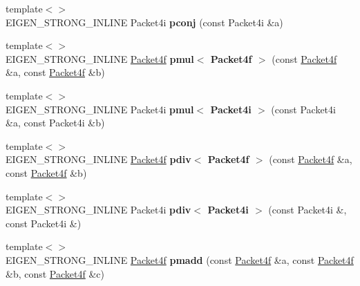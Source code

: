\begin{DoxyCompactItemize}
{\footnotesize template$<$$>$ }\\E\+I\+G\+E\+N\+\_\+\+S\+T\+R\+O\+N\+G\+\_\+\+I\+N\+L\+I\+NE Packet4i {\bfseries pconj} (const Packet4i \&a)
\item 
\mbox{\label{namespace_eigen_1_1internal_a5828d050de45a585645f9a959b52a10c}} 
{\footnotesize template$<$$>$ }\\E\+I\+G\+E\+N\+\_\+\+S\+T\+R\+O\+N\+G\+\_\+\+I\+N\+L\+I\+NE \hyperlink{struct_eigen_1_1internal_1_1_packet4f}{Packet4f} {\bfseries pmul$<$ Packet4f $>$} (const \hyperlink{struct_eigen_1_1internal_1_1_packet4f}{Packet4f} \&a, const \hyperlink{struct_eigen_1_1internal_1_1_packet4f}{Packet4f} \&b)
\item 
\mbox{\label{namespace_eigen_1_1internal_ac857e3cd556f2e2f05896b08cf703569}} 
{\footnotesize template$<$$>$ }\\E\+I\+G\+E\+N\+\_\+\+S\+T\+R\+O\+N\+G\+\_\+\+I\+N\+L\+I\+NE Packet4i {\bfseries pmul$<$ Packet4i $>$} (const Packet4i \&a, const Packet4i \&b)
\item 
\mbox{\label{namespace_eigen_1_1internal_a7a2a0544bbabeb6b84840a1f856a76a5}} 
{\footnotesize template$<$$>$ }\\E\+I\+G\+E\+N\+\_\+\+S\+T\+R\+O\+N\+G\+\_\+\+I\+N\+L\+I\+NE \hyperlink{struct_eigen_1_1internal_1_1_packet4f}{Packet4f} {\bfseries pdiv$<$ Packet4f $>$} (const \hyperlink{struct_eigen_1_1internal_1_1_packet4f}{Packet4f} \&a, const \hyperlink{struct_eigen_1_1internal_1_1_packet4f}{Packet4f} \&b)
\item 
\mbox{\label{namespace_eigen_1_1internal_adaa877d95a0fab271f252265677f2459}} 
{\footnotesize template$<$$>$ }\\E\+I\+G\+E\+N\+\_\+\+S\+T\+R\+O\+N\+G\+\_\+\+I\+N\+L\+I\+NE Packet4i {\bfseries pdiv$<$ Packet4i $>$} (const Packet4i \&, const Packet4i \&)
\item 
\mbox{\label{namespace_eigen_1_1internal_a74b4d1fb91602aebe1ae5742e8c2d566}} 
{\footnotesize template$<$$>$ }\\E\+I\+G\+E\+N\+\_\+\+S\+T\+R\+O\+N\+G\+\_\+\+I\+N\+L\+I\+NE \hyperlink{struct_eigen_1_1internal_1_1_packet4f}{Packet4f} {\bfseries pmadd} (const \hyperlink{struct_eigen_1_1internal_1_1_packet4f}{Packet4f} \&a, const \hyperlink{struct_eigen_1_1internal_1_1_packet4f}{Packet4f} \&b, const \hyperlink{struct_eigen_1_1internal_1_1_packet4f}{Packet4f} \&c)

\end{DoxyCompactItemize}
